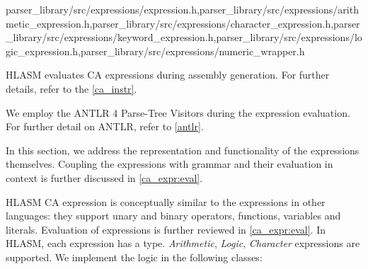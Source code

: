 {parser\_library/src/expressions/expression.h,parser\_library/src/expressions/arithmetic\_expression.h,parser\_library/src/expressions/character\_expression.h,parser\_library/src/expressions/keyword\_expression.h,parser\_library/src/expressions/logic\_expression.h,parser\_library/src/expressions/numeric\_wrapper.h}
\label{ca_expr:logic}

HLASM evaluates CA expressions during assembly generation. For further details, refer to the \cref{ca_instr}.

We employ the ANTLR 4 Parse-Tree Visitors during the expression evaluation. For further detail on ANTLR, refer to \cref{antlr}.

In this section, we address the representation and functionality of the expressions themselves. Coupling the expressions with grammar and their evaluation in context is further discussed in \cref{ca_expr:eval}.

HLASM CA expression is conceptually similar to the expressions in other languages: they support unary and binary operators, functions, variables and literals. Evaluation of expressions is further reviewed in \cref{ca_expr:eval}. In HLASM, each expression has a type. \emph{Arithmetic}, \emph{Logic}, \emph{Character} expressions are supported. We implement the logic in the following classes:

